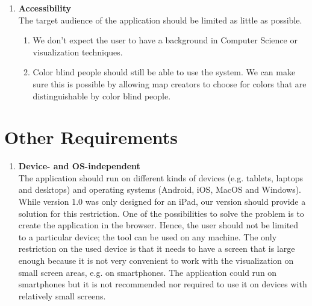 \begin{enumerate}[label=\textbf{\arabic*}., ref=\arabic*]
	\item \textbf{Accessibility\label{item:accessibility}} \hfill \\
	The target audience of the application should be limited as little as possible. 
	\begin{enumerate}
		\item We don't expect the user to have a background in Computer Science or visualization techniques. 
		\item Color blind people should still be able to use the system. We can make sure this is possible by allowing map creators to choose for colors that are distinguishable by color blind people.
	\end{enumerate}
	
\end{enumerate}



\section{Other Requirements}\label{sec:other-requirements}

\begin{enumerate}[label=\textbf{\arabic*}., ref=\arabic*]
	\item \textbf{Device- and OS-independent\label{item:device-os-independent}} \hfill \\
	The application should run on different kinds of devices (e.g. tablets, laptops and desktops) and operating systems (Android, iOS, MacOS and Windows). While version 1.0 was only designed for an iPad, our version should provide a solution for this restriction. One of the possibilities to solve the problem is to create the application in the browser. Hence, the user should not be limited to a particular device; the tool can be used on any machine. The only restriction on the used device is that it needs to have a screen that is large enough because it is not very convenient to work with the visualization on small screen areas, e.g. on smartphones. The application could run on smartphones but it is not recommended nor required to use it on devices with relatively small screens.

\end{enumerate}
